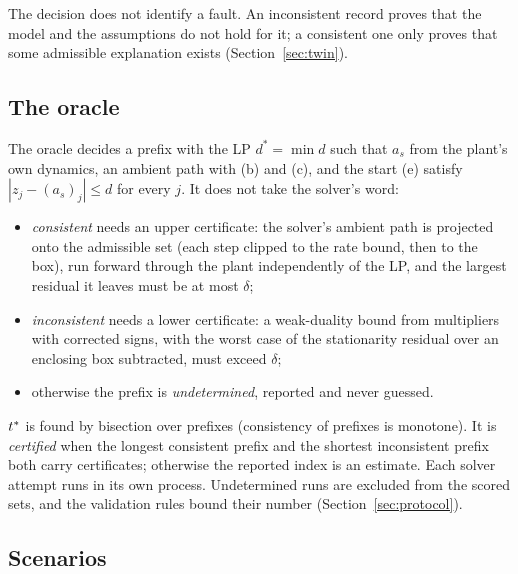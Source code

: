 The decision does not identify a fault. An inconsistent record proves that the model and the assumptions do not hold
for it; a consistent one only proves that some admissible explanation exists (Section~\ref{sec:twin}).

\subsection{The oracle}\label{sec:oracle}

The oracle decides a prefix with the LP $d^\ast = \min d$ such that $a_s$ from the plant's own dynamics, an ambient
path with (b) and (c), and the start (e) satisfy $|z_j - (a_s)_j|\le d$ for every $j$. It does not take the solver's
word:
\begin{itemize}
\item \emph{consistent} needs an upper certificate: the solver's ambient path is projected onto the admissible set
  (each step clipped to the rate bound, then to the box), run forward through the plant independently of the LP, and
  the largest residual it leaves must be at most $\delta$;
\item \emph{inconsistent} needs a lower certificate: a weak-duality bound from multipliers with corrected signs, with
  the worst case of the stationarity residual over an enclosing box subtracted, must exceed $\delta$;
\item otherwise the prefix is \emph{undetermined}, reported and never guessed.
\end{itemize}
$t^{\ast}$ is found by bisection over prefixes (consistency of prefixes is monotone). It is \emph{certified} when the
longest consistent prefix and the shortest inconsistent prefix both carry certificates; otherwise the reported index is
an estimate. Each solver attempt runs in its own process. Undetermined runs are excluded
from the scored sets, and the validation rules bound their number (Section~\ref{sec:protocol}).

\subsection{Scenarios}

